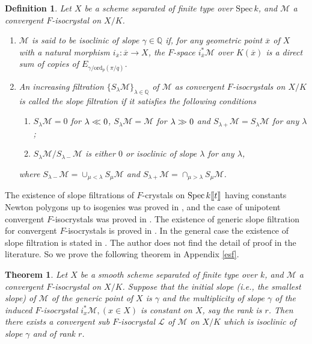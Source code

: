 \documentclass[11pt]{amsart}
\newtheorem{theorem}[Lemma]{Theorem}
\newtheorem{definition}[Lemma]{Definition}
\begin{document}
\begin{definition}\label{sfdef} Let $X$ be a scheme separated of finite type over $\mathrm{Spec}\, k$, and 
$\mathcal M$ a convergent $F$-isocrystal on $X/K$. 
\begin{enumerate}
\item $\mathcal M$ is said to be isoclinic of slope $\gamma \in\mathbb Q$ 
if, for any geometric point $\overline{x}$ of $X$ with a natural morphism $i_{\overline{x}} : \overline{x} \rightarrow X$, 
the $F$-space $i_{\overline{x}}^\ast\mathcal M$ over $K(\overline{x})$ is a direct sum of copies of 
$E_{\gamma/\mathrm{ord}_p(\pi/q)}$. 
\item An increasing filtration $\{S_\lambda \mathcal M\}_{\lambda \in \mathbb Q}$ of $\mathcal M$ as convergent 
$F$-isocrystals on $X/K$ is called the slope filtration if it satisfies the following conditions
\begin{enumerate}
\item[(i)] $S_\lambda \mathcal M = 0$ for $\lambda <\hspace*{-1.5mm}< 0$, 
$S_\lambda \mathcal M = \mathcal M$ for $\lambda >\hspace*{-1.5mm}> 0$ and 
$S_{\lambda+} \mathcal M = S_\lambda \mathcal M$ for any $\lambda$; 
\item[(ii)] $S_\lambda \mathcal M/S_{\lambda -} \mathcal M$ is 
either $0$ or isoclinic of slope $\lambda$ for any $\lambda$, 
\end{enumerate}
where $S_{\lambda -} \mathcal M = \cup_{\mu < \lambda} S_\mu \mathcal M$ 
and $S_{\lambda +} \mathcal M = \cap_{\mu > \lambda} S_\mu \mathcal M$. 
\end{enumerate}
\end{definition}

The existence of slope filtrations of $F$-crystals 
on $\mathrm{Spec}\, k[\hspace*{-0.4mm}[t]\hspace*{-0.4mm}]$ having constants Newton polygons up to isogenies 
was proved in \cite[Corollary 2.6.3]{Kat}, and 
the case of unipotent convergent $F$-isocrystals 
was proved in \cite[Th\'eor\`eme  3.2.3]{CLpente}. 
The existence of generic slope filtration for convergent $F$-isocrystals is proved in \cite[Proposition 5.8]{Shi0}. 
In the general case the existence of slope filtration is stated in \cite[Corollary 4.2]{Ke2}. 
The author does not find the detail of proof in the literature. So 
we prove the following theorem in Appendix \ref{esf}. 

\begin{theorem}\label{fil} 
Let $X$ be a smooth scheme separated of finite type over $k$, and $\mathcal M$ 
a convergent $F$-isocrystal on $X/K$. Suppose that the initial slope (i.e., the smallest slope) of $\mathcal M$ 
of the generic point of $X$ is $\gamma$ and the multiplicity of slope $\gamma$ 
of the induced $F$-isocrystal $i_x^\ast\mathcal M, (x \in X)$ is constant on $X$, say the rank is $r$. 
Then there exists a convergent sub $F$-isocrystal $\mathcal L$ of $\mathcal M$ on $X/K$ 
which is isoclinic of slope $\gamma$ and of rank $r$. 
\end{theorem}
\end{document}
